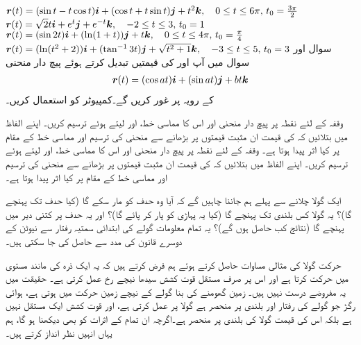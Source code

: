 ${{\boldsymbol{r}}}(t)=(\sin t-t\cos t){\boldsymbol{i}}+(\cos t+t\sin t){\boldsymbol{j}}+t^2{\boldsymbol{k}},\quad 0\le t\le 6\pi,\, t_0=\frac{3\pi}{2}$
${{\boldsymbol{r}}}(t)=\sqrt{2}t{\boldsymbol{i}}+e^t{\boldsymbol{j}}+e^{-t}{\boldsymbol{k}},\quad -2\le t\le 3,\, t_0=1$
${{\boldsymbol{r}}}(t)=(\sin 2t){\boldsymbol{i}}+(\ln(1+t)){\boldsymbol{j}}+t{\boldsymbol{k}},\quad 0\le t\le 4\pi,\, t_0=\frac{\pi}{4}$
${{\boldsymbol{r}}}(t)=(\ln(t^2+2)){\boldsymbol{i}}+(\tan^{-1}3t){\boldsymbol{j}}+\sqrt{t^2+1}{\boldsymbol{k}},\quad -3\le t\le 5,\, t_0=3$
سوال  اور سوال    میں  آپ   اور  کی قیمتیں تبدیل کرتے ہوئے پیچ دار منحنی
\begin{align*}
{\ensuremath{{\boldsymbol{r}}}}(t)=(\cos at){\boldsymbol{i}}+(\sin at){\boldsymbol{j}}+bt {\boldsymbol{k}}
\end{align*}
کے رویہ پر غور کریں گے۔کمپیوٹر کو استعمال کریں۔

وقفہ  کے لئے نقطہ   پر پیچ دار منحنی اور اس کا مماسی خط،   اور  لیتے ہوئے    ترسیم کریں۔ اپنے الفاظ میں بتلائیں کہ  کی قیمت ان مثبت  قیمتوں پر بڑھانے سے منحنی   کی ترسیم اور مماسی خط کے مقام  پر کیا اثر پیدا ہوتا ہے۔ 
وقفہ  کے لئے نقطہ   پر پیچ دار منحنی اور اس کا مماسی خط،   اور  لیتے ہوئے    ترسیم کریں۔ اپنے الفاظ میں بتلائیں کہ  کی قیمت ان مثبت  قیمتوں   پر بڑھانے سے منحنی   کی ترسیم اور مماسی خط کے مقام  پر کیا اثر پیدا ہوتا ہے۔ 


ایک گولا چلانے سے پہلے  ہم جاننا چاہیں گے کہ آیا وہ حدف کو مار سکے گا (کیا حدف تک پہنچے گا)؟   یہ گولا کس  بلندی  تک  پہنچے گا (کیا یہ  پہاڑی کو پار کر پائے گا)؟ اور  یہ حدف پر کتنی دیر میں پہنچے گا (نتائج   کب حاصل  ہوں گے)؟ یہ تمام معلومات  گولے کی ابتدائی سمتیہ رفتار سے نیوٹن کے دوسرے قانون کی مدد سے حاصل کی جا سکتی ہیں۔

حرکت  گولا کی مثالی مساوات حاصل کرتے ہوئے ہم  فرض کرتے ہیں کہ یہ ایک ذرہ کی مانند مستوی میں حرکت کرتا ہے اور اس پر صرف  مستقل   قوت کشش   سیدھا نیچے رخ عمل   کرتی ہے۔ حقیقت میں یہ مفروضے  درست نہیں  ہیں۔ زمین گھومنے کی بنا گولے کے نیچے    زمین  حرکت میں ہوتی  ہے، ہوائی  رگڑ  جو  گولے کی رفتار اور بلندی پر منحصر ہے گولا    پر عمل کرتی ہے، اور قوت کشش ایک مستقل نہیں ہے بلکہ اس کی قیمت  گولا کی بلندی پر منحصر ہے۔اگرچہ ان تمام کے اثرات کو بھی دیکھنا ہو گا، ہم یہاں انہیں نظر انداز کرتے ہیں۔

